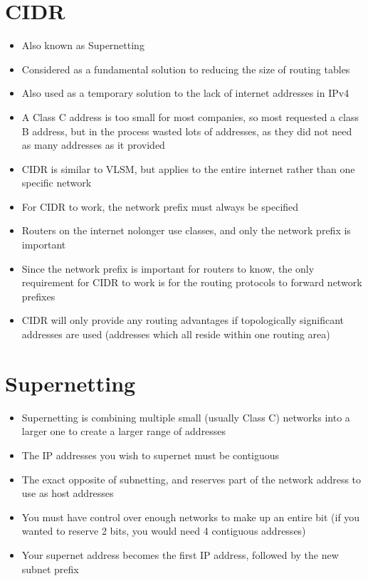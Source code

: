
\section*{CIDR}

\begin{itemize}
  \item Also known as Supernetting
  \item Considered as a fundamental solution to reducing the size of routing tables
  \item Also used as a temporary solution to the lack of internet addresses in IPv4
  \item A Class C address is too small for most companies, so most requested a class B address, but in the process wasted lots of addresses, as they did not need as many addresses as it provided
  \item CIDR is similar to VLSM, but applies to the entire internet rather than one specific network
  \item For CIDR to work, the network prefix must always be specified
  \item Routers on the internet nolonger use classes, and only the network prefix is important
  \item Since the network prefix is important for routers to know, the only requirement for CIDR to work is for the routing protocols to forward network prefixes
  \item CIDR will only provide any routing advantages if topologically significant addresses are used (addresses which all reside within one routing area)
\end{itemize}

\section*{Supernetting}

\begin{itemize}
  \item Supernetting is combining multiple small (usually Class C) networks into a larger one to create a larger range of addresses
  \item The IP addresses you wish to supernet must be contiguous
  \item The exact opposite of subnetting, and reserves part of the network address to use as host addresses
  \item You must have control over enough networks to make up an entire bit (if you wanted to reserve 2 bits, you would need 4 contiguous addresses)
  \item Your supernet address becomes the first IP address, followed by the new subnet prefix
\end{itemize}